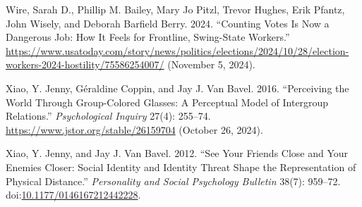 \documentclass[
  12pt,
  letterpaper,
]{article}
\newlength{\cslhangindent}
\newenvironment{CSLReferences}[2] %
 {\begin{list}{}{%
  \setlength{\itemindent}{0pt}
  \setlength{\leftmargin}{0pt}
  \setlength{\parsep}{0pt}
  \ifodd #1
   \setlength{\leftmargin}{\cslhangindent}
   \setlength{\itemindent}{-1\cslhangindent}
  \fi
  \setlength{\itemsep}{#2\baselineskip}}}
 {\end{list}}
\begin{document}
\begin{CSLReferences}{1}{1}
Wire, Sarah D., Phillip M. Bailey, Mary Jo Pitzl, Trevor Hughes, Erik
Pfantz, John Wisely, and Deborah Barfield Berry. 2024. {``Counting Votes
Is Now a Dangerous Job: How It Feels for Frontline, Swing-State
Workers.''}
\url{https://www.usatoday.com/story/news/politics/elections/2024/10/28/election-workers-2024-hostility/75586254007/}
(November 5, 2024).

Xiao, Y. Jenny, Géraldine Coppin, and Jay J. Van Bavel. 2016.
{``Perceiving the {World Through Group-Colored Glasses}: {A Perceptual
Model} of {Intergroup Relations}.''} \emph{Psychological Inquiry} 27(4):
255--74. \url{https://www.jstor.org/stable/26159704} (October 26, 2024).

Xiao, Y. Jenny, and Jay J. Van Bavel. 2012. {``See {Your Friends Close}
and {Your Enemies Closer}: {Social Identity} and {Identity Threat Shape}
the {Representation} of {Physical Distance}.''} \emph{Personality and
Social Psychology Bulletin} 38(7): 959--72.
doi:\href{https://doi.org/10.1177/0146167212442228}{10.1177/0146167212442228}.

\end{CSLReferences}
\end{document}
